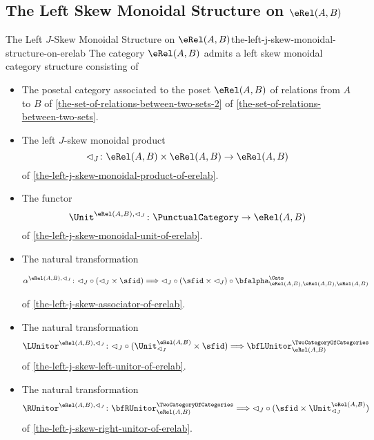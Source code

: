 \subsection{The Left Skew Monoidal Structure on $\eRel(A,B)$}\label{subsection-the-left-skew-monoidal-structure-on-rel-a-b}
\begin{proposition}{The Left $J$-Skew Monoidal Structure on $\eRel(A,B)$}{the-left-j-skew-monoidal-structure-on-erelab}%
    The category $\eRel(A,B)$ admits a left skew monoidal category structure consisting of%
    \begin{itemize}
        \item{}The posetal category associated to the poset $\eRel(A,B)$ of relations from $A$ to $B$ of \cref{the-set-of-relations-between-two-sets-2} of \cref{the-set-of-relations-between-two-sets}.
        \item{}The left $J$-skew monoidal product
            \[
                \lhd_{J}%
                \colon%
                \eRel(A,B)\times\eRel(A,B)%
                \to%
                \eRel(A,B)
            \]%
            of \cref{the-left-j-skew-monoidal-product-of-erelab}.
        \item{}The functor
            \[
                \Unit^{\eRel(A,B),\lhd_{J}}
                \colon
                \PunctualCategory
                \to
                \eRel(A,B)
            \]
            of \cref{the-left-j-skew-monoidal-unit-of-erelab}.
        \item{}The natural transformation
            \begin{envsmallsize}
                \[
                    \alpha^{\eRel(A,B),\lhd_{J}}%
                    \colon%
                    {\lhd_{J}}\circ{({\lhd_{J}}\times\sfid)}%
                    \Longrightarrow%
                    {\lhd_{J}}\circ{(\sfid\times{\lhd_{J}})}\circ{\bfalpha^{\Cats}_{\eRel(A,B),\eRel(A,B),\eRel(A,B)}}%
                \]
            \end{envsmallsize}
            of \cref{the-left-j-skew-associator-of-erelab}.
        \item{}The natural transformation
            \[
                \LUnitor^{\eRel(A,B),\lhd_{J}}
                \colon
                {\lhd_{J}}\circ{({\Unit^{\eRel(A,B)}_{\lhd_{J}}}\times{\sfid})}
                \Longrightarrow
                \bfLUnitor^{\TwoCategoryOfCategories}_{\eRel(A,B)}%
            \]
            of \cref{the-left-j-skew-left-unitor-of-erelab}.
        \item{}The natural transformation
            \[
                \RUnitor^{\eRel(A,B),\lhd_{J}}
                \colon
                \bfRUnitor^{\TwoCategoryOfCategories}_{\eRel(A,B)}
                \Longrightarrow
                {\lhd_{J}}\circ{(\sfid\times\Unit^{\eRel(A,B)}_{\lhd_{J}})}
            \]
            of \cref{the-left-j-skew-right-unitor-of-erelab}.
    \end{itemize}
\end{proposition}
